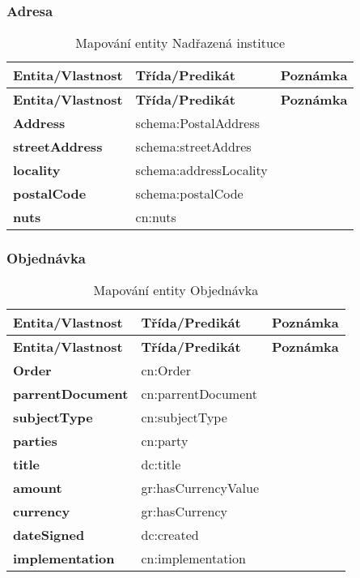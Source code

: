 \subsubsection*{Adresa}

\begin{center}
\begin{longtable}{lll}
\label{grid_mlmmh} \\
\multicolumn{1}{l}{\textbf{Entita/Vlastnost}} & 
\multicolumn{1}{l}{\textbf{Třída/Predikát}} & 
\multicolumn{1}{l}{\textbf{Poznámka}} \\ \hline 
\endfirsthead
\multicolumn{1}{l}{\textbf{Entita/Vlastnost}} & 
\multicolumn{1}{l}{\textbf{Třída/Predikát}} & 
\multicolumn{1}{l}{\textbf{Poznámka}} \\ \hline 
\hline
\endhead
\endfoot
\caption{Mapování entity Nadřazená instituce}
\endlastfoot
\textbf{Address} & schema:PostalAddress \\
\textbf{streetAddress} & schema:streetAddres \\
\textbf{locality} & schema:addressLocality \\
\textbf{postalCode} & schema:postalCode \\
\textbf{nuts} & cn:nuts \\
\end{longtable}
\end{center}

\subsubsection*{Objednávka}

\begin{center}
\begin{longtable}{lll}
\label{grid_mlmmh} \\
\multicolumn{1}{l}{\textbf{Entita/Vlastnost}} & 
\multicolumn{1}{l}{\textbf{Třída/Predikát}} & 
\multicolumn{1}{l}{\textbf{Poznámka}} \\ \hline 
\endfirsthead
\multicolumn{1}{l}{\textbf{Entita/Vlastnost}} & 
\multicolumn{1}{l}{\textbf{Třída/Predikát}} & 
\multicolumn{1}{l}{\textbf{Poznámka}} \\ \hline 
\hline
\endhead
\endfoot
\caption{Mapování entity Objednávka}
\endlastfoot
\textbf{Order} & cn:Order \\
\textbf{parrentDocument} & cn:parrentDocument \\
\textbf{subjectType} & cn:subjectType \\
\textbf{parties} & cn:party \\
\textbf{title} & dc:title \\
\textbf{amount} & gr:hasCurrencyValue \\
\textbf{currency} & gr:hasCurrency \\
\textbf{dateSigned} & dc:created \\
\textbf{implementation} & cn:implementation \\
\end{longtable}
\end{center}

